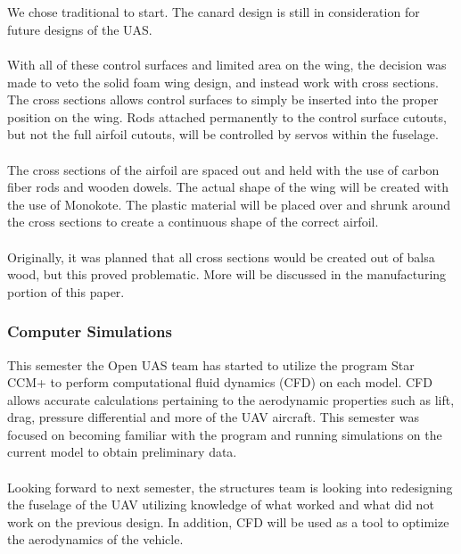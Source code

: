 \documentclass{article}
\begin{document}
\\
\\We chose traditional to start. The canard design is still in consideration for future designs of the UAS. 
\\
\\With all of these control surfaces and limited area on the wing, the decision was made to veto the solid foam wing design, and instead work with cross sections. The cross sections allows control surfaces to simply be inserted into the proper position on the wing. Rods attached permanently to the control surface cutouts, but not the full airfoil cutouts, will be controlled by servos within the fuselage. 
\\
\\The cross sections of the airfoil are spaced out and held with the use of carbon fiber rods and wooden dowels. The actual shape of the wing will be created with the use of Monokote. The plastic material will be placed over and shrunk around the cross sections to create a continuous shape of the correct airfoil.
\\
\\Originally, it was planned that all cross sections would be created out of balsa wood, but this proved problematic. More will be discussed in the manufacturing portion of this paper. 


\subsubsection{Computer Simulations}
\noindent This semester the Open UAS team has started to utilize the program Star CCM+ to perform computational fluid dynamics (CFD) on each model. CFD allows accurate calculations pertaining to the aerodynamic properties such as lift, drag, pressure differential and more of the UAV aircraft. This semester was focused on becoming familiar with the program and running simulations on the current model to obtain preliminary data.
\\
\\Looking forward to next semester, the structures team is looking into redesigning the fuselage of the UAV utilizing knowledge of what worked and what did not work on the previous design. In addition, CFD will be used as a tool to optimize the aerodynamics of the vehicle.   
\end{document}
